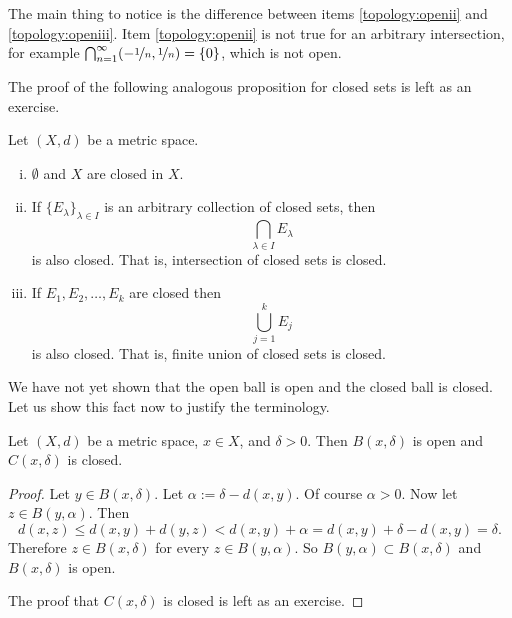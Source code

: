 \documentclass[12pt]{book}
\begin{document}
\begin{example}
The main thing to notice is the difference between
items
\ref{topology:openii} and \ref{topology:openiii}.
Item \ref{topology:openii} is not true for an arbitrary intersection,
for example $\bigcap_{n=1}^\infty (-\nicefrac{1}{n},\nicefrac{1}{n}) = \{ 0
\}$, which is not open.
\end{example}


The proof of the following analogous proposition for closed sets
is left as an exercise.

\begin{prop} \label{prop:topology:closed}
Let $(X,d)$ be a metric space.
\begin{enumerate}[(i)]
\item \label{topology:closedi} $\emptyset$ and $X$ are closed in $X$.
\item \label{topology:closedii} If $\{ E_\lambda \}_{\lambda \in I}$ is
an arbitrary collection of closed sets, then
\begin{equation*}
\bigcap_{\lambda \in I} E_\lambda
\end{equation*}
is also closed.
That is, intersection of closed sets is closed.
\item \label{topology:closediii} If $E_1, E_2, \ldots, E_k$ are closed then
\begin{equation*}
\bigcup_{j=1}^k E_j
\end{equation*}
is also closed.
That is, finite union of closed sets is closed.
\end{enumerate}
\end{prop}

We have not yet shown that the open ball is open and the closed ball is
closed.
Let us show this fact now to justify the terminology.

\begin{prop} \label{prop:topology:ballsopenclosed}
Let $(X,d)$ be a metric space, $x \in X$, and $\delta > 0$.
Then
$B(x,\delta)$ is open and 
$C(x,\delta)$ is closed.
\end{prop}

\begin{proof}
Let $y \in B(x,\delta)$.
Let $\alpha := \delta-d(x,y)$.
Of course $\alpha
> 0$.
Now let $z \in B(y,\alpha)$.
Then
\begin{equation*}
d(x,z) \leq d(x,y) + d(y,z) < d(x,y) + \alpha = d(x,y) + \delta-d(x,y) =
\delta .
\end{equation*}
Therefore $z \in B(x,\delta)$ for every $z \in B(y,\alpha)$.
So $B(y,\alpha) \subset B(x,\delta)$ and
$B(x,\delta)$ is open.

The proof that $C(x,\delta)$ is closed is left as an exercise.
\end{proof}
\end{document}
